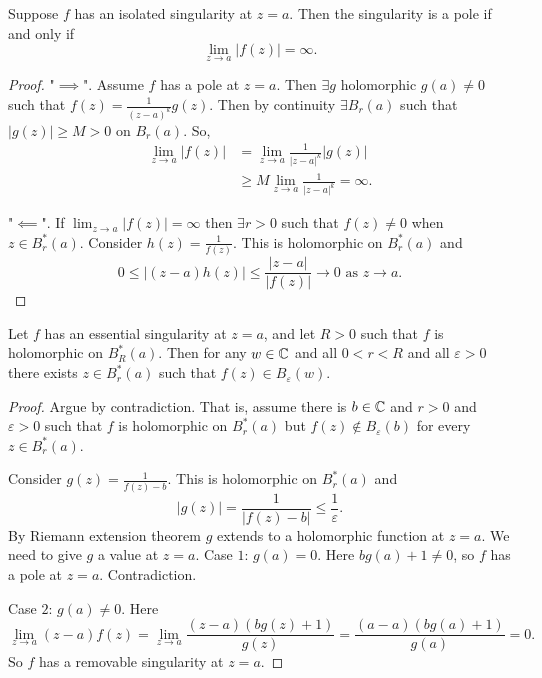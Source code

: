 \documentclass[10pt, a4paper]{article}
\begin{document}
\begin{proposition}
    Suppose $f$ has an isolated singularity at $z = a$.
    Then the singularity is a pole if and only if
    \[
    \lim_{z \to a}|f(z)| = \infty.
    \]

    \begin{proof}
        "$\implies$".
        Assume $f$ has a pole at $z = a$.
        Then $\exists g$ holomorphic $g(a) \neq 0$ such that $f(z) = \frac{1}{(z - a) ^ k}g(z)$.
        Then by continuity $\exists B_r(a)$ such that $|g(z)| \geq M > 0$ on $B_r(a)$.
        So,
        \begin{align*}
            \lim_{z \to a}|f(z)| &= \lim_{z \to a}\frac{1}{|z - a| ^ k}|g(z)| \\
            &\geq M\lim_{z \to a}\frac{1}{|z - a| ^ k} = \infty.
        \end{align*}

        "$\impliedby$".
        If $\lim_{z \to a}|f(z)| = \infty$ then $\exists r > 0$ such that $f(z) \neq 0$ when $z \in B_{r}^{*}(a)$.
        Consider $h(z) = \frac{1}{f(z)}$.
        This is holomorphic on $B_{r}^{*}(a)$ and
        \[
        0 \leq |(z - a)h(z)| \leq \frac{|z - a|}{|f(z)|} \to 0\text{ as } z \to a.
        \]
    \end{proof}
\end{proposition}

\begin{theorem}
    Let $f$ has an essential singularity at $z = a$,
    and let $R > 0$ such that $f$ is holomorphic on $B_{R}^{*}(a)$.
    Then for any $w \in \mathbb{C}$ and all $0 < r < R$ and all $\varepsilon > 0$ there exists $z \in B_{r}^{*}(a)$ such that $f(z) \in B_{\varepsilon}(w)$.

    \begin{proof}
        Argue by contradiction.
        That is,
        assume there is $b \in \mathbb{C}$ and $r > 0$ and $\varepsilon > 0$ such that $f$ is holomorphic on $B_{r}^{*}(a)$ but $f(z) \notin B_{\varepsilon}(b)$ for every $z \in B_{r}^{*}(a)$.

        Consider $g(z) = \frac{1}{f(z) - b}$.
        This is holomorphic on $B_{r}^{*}(a)$ and
        \[
        |g(z)| = \frac{1}{|f(z) - b|} \leq \frac{1}{\varepsilon}.
        \]
        By Riemann extension theorem $g$ extends to a holomorphic function at $z = a$.
        We need to give $g$ a value at $z = a$.
        Case $1$:
        $g(a) = 0$.
        Here $bg(a) + 1 \neq 0$,
        so $f$ has a pole at $z = a$.
        Contradiction.
        
        Case $2$:
        $g(a) \neq 0$.
        Here
        \[
        \lim_{z \to a}(z - a)f(z) = \lim_{z \to a}\frac{(z - a)(bg(z) + 1)}{g(z)} = \frac{(a - a)(bg(a) + 1)}{g(a)} = 0.
        \]
        So $f$ has a removable singularity at $z = a$.
    \end{proof}
\end{theorem}
\end{document}
